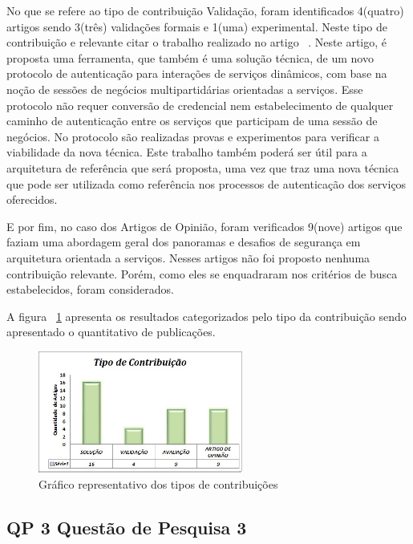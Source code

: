 No que se refere ao tipo de contribuição Validação, foram identificados 4(quatro) artigos  sendo 3(três) validações formais e 1(uma) experimental. Neste tipo de contribuição e relevante citar o trabalho realizado no artigo ~\cite{ CrossRealmSOA2012}. Neste artigo, é proposta uma ferramenta, que também é uma solução técnica, de um novo protocolo de autenticação para interações de serviços dinâmicos, com base na noção de sessões de negócios multipartidárias orientadas a serviços. Esse protocolo não requer conversão de credencial nem estabelecimento de qualquer caminho de autenticação entre os serviços que participam de uma sessão de negócios. No protocolo são realizadas provas e experimentos para verificar a viabilidade da nova técnica. Este trabalho também poderá ser útil para a arquitetura de referência que será proposta, uma vez que traz uma nova técnica que pode ser utilizada como referência nos processos de autenticação dos serviços oferecidos.

E por fim, no caso dos Artigos de Opinião, foram verificados 9(nove) artigos que faziam uma abordagem geral dos panoramas e desafios de segurança em arquitetura orientada a serviços. Nesses artigos não foi proposto nenhuma contribuição relevante. Porém, como eles se enquadraram nos critérios de busca estabelecidos, foram considerados.

A figura ~\ref{fig:Tipo_Contribuicao} apresenta os resultados categorizados pelo tipo da contribuição sendo apresentado o quantitativo de publicações.

\begin{figure}[!htb]
\centering
\includegraphics[width=0.6\textwidth]{tipo_contribuicao_3.jpg}
\caption{Gráfico representativo dos tipos de contribuições}
\label{fig:Tipo_Contribuicao}
\end{figure}


\subsection{QP 3 \- Questão de Pesquisa 3}

